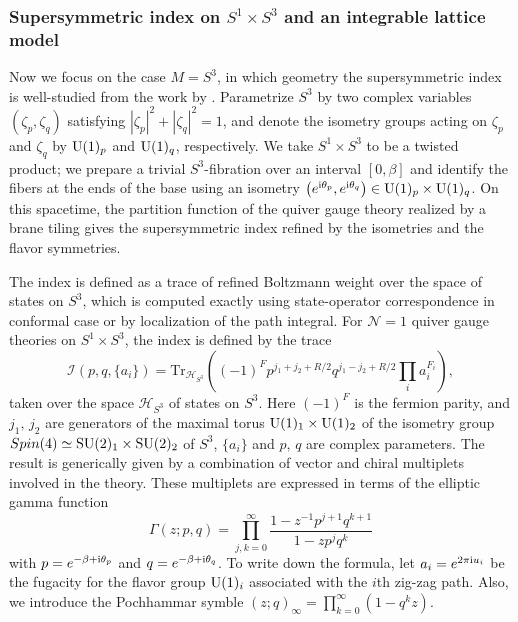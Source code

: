 \subsubsection{Supersymmetric index on $S^{1} \times S^{3}$ and an integrable lattice
model}

Now we focus on the case $M=S^{3}$, in which geometry the supersymmetric
index is well-studied from the work by \cite{Romelsberger:2005eg,Kinney:2005ej,Festuccia:2011ws}.
Parametrize $S^{3}$ by two complex variables
$(\zeta_{p},\zeta_{q})$ satisfying $|\zeta_{p}|^{2}+|\zeta_{q}|^{2}=1$,
and denote the isometry groups acting on $\zeta_{p}$ and $\zeta_{q}$
by $\mathrm{U}(1)_{p}$ and $\mathrm{U}(1)_{q}$, respectively. We take $S^{1}\times S^{3}$
to be a twisted product; we prepare a trivial $S^{3}$-fibration over
an interval $[0,\beta]$ and identify the fibers at the ends of the
base using an isometry $\left(e^{\mathrm{i}\theta_{p}},e^{\mathrm{i}\theta_{q}}\right)\in \mathrm{U}(1)_{p}\times \mathrm{U}(1)_{q}$.
On this spacetime, the partition function of the quiver gauge theory
realized by a brane tiling gives the supersymmetric index refined
by the isometries and the flavor symmetries.

The index is defined as a trace of refined Boltzmann weight over the
space of states on $S^{3}$, which is computed exactly using state-operator
correspondence in conformal case or by localization of the path integral.
For $\mathcal{N}=1$ quiver gauge theories on $S^{1}\times S^{3}$, the
index is defined by the trace
\begin{equation}
    \mathcal{I}(p,q,\{ a_{i}\} )
      =  \mathrm{Tr}_{\mathcal{H}_{S^{3}}}
      \left(    (-1)^{F}  p^{j_{1}+j_{2}+R/2}  q^{j_{1}-j_{2}+R/2}  \prod_{i}a_{i}^{F_{i}}    \right),
\end{equation}
taken over the space $\mathcal{H}_{S^{3}}$ of states on $S^{3}$.
Here $\left(-1\right)^{F}$ is the fermion parity, and $j_{1},\,j_{2}$
are generators of the maximal torus $\mathrm{U}(1)_{1}\times \mathrm{U}(1)_{2}$ of
the isometry group $Spin(4)\simeq \mathrm{SU}(2)_{1}\times \mathrm{SU}(2)_{2}$ of $S^{3}$,
$\{ a_i \}$ and $p,\,q$ are complex parameters.
The result is generically given by a combination of vector and chiral
multiplets involved in the theory. These multiplets are expressed
in terms of the elliptic gamma function
\begin{equation}
    \Gamma(z;p,q)  =  \prod_{j,k=0}^{\infty}  \frac{1-z^{-1}p^{j+1}q^{k+1}}{1-zp^{j}q^{k}}
\end{equation}
with $p=e^{-\beta+\mathrm{i}\theta_{p}}$ and $q=e^{-\beta+\mathrm{i}\theta_{q}}$.
To write down the formula, let $a_{i}=e^{2\pi \mathrm{i} u_{i}}$ be the fugacity
for the flavor group $\mathrm{U}(1)_i$ associated with the $i$th zig-zag path.
Also, we introduce the Pochhammar symble $(z;q)_{\infty}=\prod_{k=0}^{\infty}\left(1-q^{k}z\right)$.


